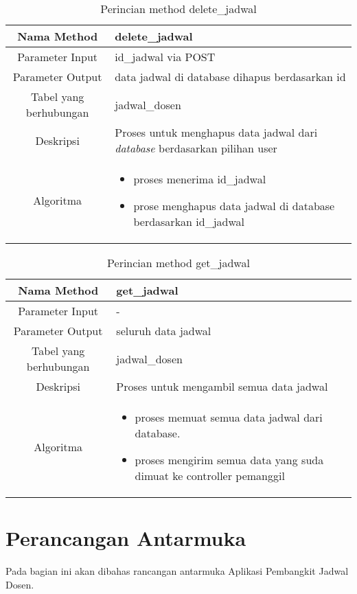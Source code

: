 \begin{center}
\begin{table}[H]
\begin{tabular}{|c|p{11cm}|}
\hline
Nama Method 	& 	delete\_jadwal 	\\
\hline
Parameter Input & id\_jadwal via POST \\
\hline
Parameter Output & data jadwal di database dihapus berdasarkan id \\
\hline
Tabel yang berhubungan & jadwal\_dosen \\
\hline
Deskripsi	& Proses untuk menghapus data jadwal dari \textit{database} berdasarkan pilihan user \\
\hline
Algoritma	& \begin{itemize}
				\item proses menerima id\_jadwal
				\item prose menghapus data jadwal di database berdasarkan id\_jadwal
				\end{itemize} \\
\hline
\end{tabular}
\caption{Perincian method delete\_jadwal}
\end{table}
\end{center}


\begin{center}
\begin{table}[H]
\begin{tabular}{|c|p{11cm}|}
\hline
Nama Method 	& 	get\_jadwal 	\\
\hline
Parameter Input &  - \\
\hline
Parameter Output & seluruh data jadwal \\
\hline
Tabel yang berhubungan & jadwal\_dosen \\
\hline
Deskripsi	& Proses untuk mengambil semua data jadwal \\
\hline
Algoritma	& \begin{itemize}
				\item proses memuat semua data jadwal dari database.
				\item proses mengirim semua data yang suda dimuat ke controller pemanggil
				\end{itemize} \\
\hline
\end{tabular}
\caption{Perincian method get\_jadwal}
\end{table}
\end{center}


\section{Perancangan Antarmuka}
Pada bagian ini akan dibahas rancangan antarmuka Aplikasi Pembangkit Jadwal Dosen.

